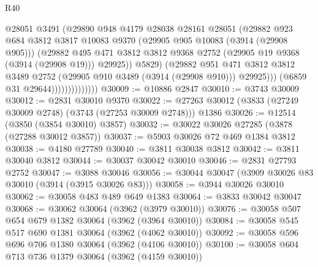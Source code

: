 \begin{lexlean}{R40}
\begin{coremodule}
                                  @28051
                                  @3491
                                  (@29890
                                    @948
                                    @4179
                                    @28038
                                    @28161
                                    @28051
                                    (@29882
                                      @923
                                      @684
                                      @3812
                                      @3817
                                      @10083
                                      @9370
                                      (@29905 @905 @10083 (@3914 (@29908 @905)))
                                      (@29882
                                        @495
                                        @471
                                        @3812
                                        @3812
                                        @9368
                                        @2752
                                        (@29905 @19 @9368 (@3914 (@29908 @19)))
                                        @29925))
                                    @5829)
                                  (@29882
                                    @951
                                    @471
                                    @3812
                                    @3812
                                    @3489
                                    @2752
                                    (@29905 @910 @3489 (@3914 (@29908 @910)))
                                    @29925)))
                              (@6859 @31 @29644))))))))))))))
@30009 := @10886 @2847
@30010 := @3743 @30009
@30012 := @2831 @30010 @9370
@30022 := @27263 @30012 (@3833 (@27249 @30009 @2748) (@3743 (@27253 @30009 @2748))) @1386
@30026 := @12514 (@3850 (@3854 @30010) @3857)
@30032 := @30022 @30026 @27285 (@3878 (@27288 @30012 @3857))
@30037 := @5903 @30026 @72 @469 @1384 @3812
@30038 := @4180 @27789
@30040 := @3811 @30038 @3812
@30042 := @3811 @30040 @3812
@30044 := @30037 @30042 @30010
@30046 := @2831 @27793 @2752
@30047 := @3088 @30046
@30056 := @30044 @30047 (@3909 @30026 @83 @30010 (@3914 (@3915 @30026 @83)))
@30058 := @3944 @30026 @30010
@30062 := @30058 @483 @489 @649 @1383
@30064 := @3833 @30042 @30047
@30068 := @30062 @30064 (@3962 (@3979 @30010))
@30076 := @30058 @507 @654 @679 @1382 @30064 (@3962 (@3964 @30010))
@30084 := @30058 @545 @517 @690 @1381 @30064 (@3962 (@4062 @30010))
@30092 := @30058 @596 @696 @706 @1380 @30064 (@3962 (@4106 @30010))
@30100 := @30058 @604 @713 @736 @1379 @30064 (@3962 (@4159 @30010))

\end{coremodule}
\end{lexlean}
